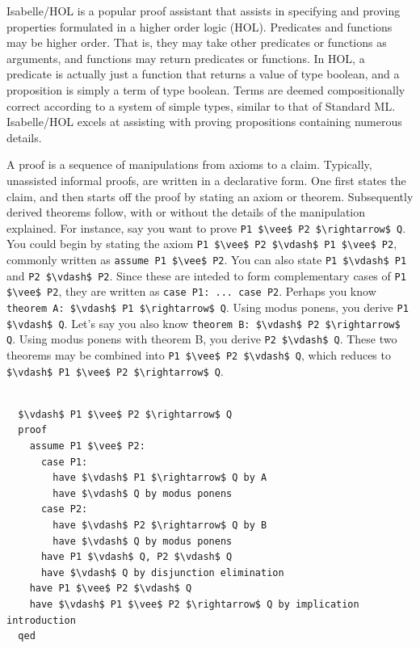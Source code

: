 \documentclass[letterpaper, 11pt]{report}
\begin{document}
Isabelle/HOL is a popular proof assistant that assists in specifying and proving properties
formulated in a higher order logic (HOL). Predicates and functions may be higher order. That is, they
may take other predicates or functions as arguments, and functions may return predicates or functions. 
In HOL, a predicate is actually just a function that returns a value of type boolean, and a proposition
is simply a term of type boolean. Terms are deemed compositionally correct according to a system of simple types, similar to
that of Standard ML. Isabelle/HOL excels at assisting with proving propositions containing numerous details. 

A proof is a sequence of manipulations from axioms to a claim. 
Typically, unassisted informal proofs, are written in a declarative form. One first states the claim,
and then starts off the proof by stating an axiom or theorem. Subsequently derived theorems follow, with
or without the details of the manipulation explained.
For instance, say you want to prove \lstinline[mathescape]{P1 $\vee$ P2 $\rightarrow$ Q}. You could begin by 
stating the axiom \lstinline[mathescape]{P1 $\vee$ P2 $\vdash$ P1 $\vee$ P2}, commonly written as \lstinline[language=logic]{assume P1 $\vee$ P2}.
You can also state \lstinline[mathescape]{P1 $\vdash$ P1} and \lstinline[mathescape]{P2 $\vdash$ P2}. Since
these are inteded to form complementary cases of \lstinline[mathescape]{P1 $\vee$ P2}, they are written as \lstinline[language=logic]{case P1: ... case P2}.
Perhaps you know \lstinline[language=logic]{theorem A: $\vdash$ P1 $\rightarrow$ Q}. Using modus ponens, you derive \lstinline[mathescape]{P1 $\vdash$ Q}. Let's say
you also know \lstinline[language=logic]{theorem B: $\vdash$ P2 $\rightarrow$ Q}. Using modus ponens with theorem B, you derive \lstinline[mathescape]{P2 $\vdash$ Q}.
These two theorems may be combined into \lstinline[mathescape]{P1 $\vee$ P2 $\vdash$ Q}, which reduces to \lstinline[mathescape]{$\vdash$ P1 $\vee$ P2 $\rightarrow$ Q}.


\begin{lstlisting}[language=logic, mathescape]
  
  $\vdash$ P1 $\vee$ P2 $\rightarrow$ Q
  proof
    assume P1 $\vee$ P2:
      case P1:
        have $\vdash$ P1 $\rightarrow$ Q by A
        have $\vdash$ Q by modus ponens
      case P2:
        have $\vdash$ P2 $\rightarrow$ Q by B    
        have $\vdash$ Q by modus ponens
      have P1 $\vdash$ Q, P2 $\vdash$ Q
      have $\vdash$ Q by disjunction elimination
    have P1 $\vee$ P2 $\vdash$ Q
    have $\vdash$ P1 $\vee$ P2 $\rightarrow$ Q by implication introduction  
  qed
  
\end{lstlisting}
\end{document}
